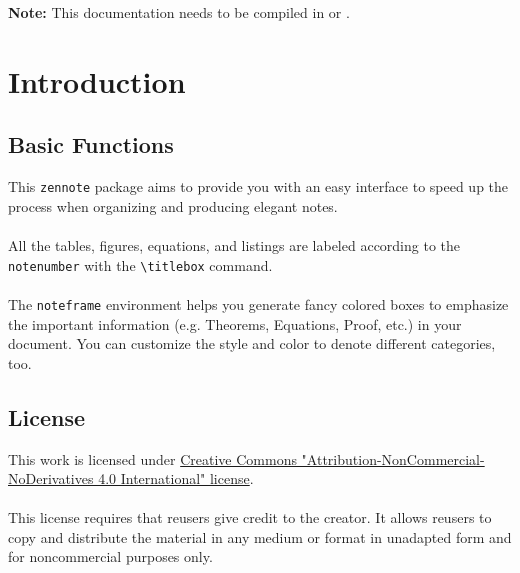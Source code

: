 \documentclass{article}
\begin{document}

{{\bf Note: }This documentation needs to be compiled in {\textcm {}} or {\textcm {}}.}

\thispagestyle{empty}
\tableofcontents

\newpage
\setcounter{page}{1}

\section{Introduction}
\subsection{Basic Functions}
This {\tt zennote} package aims to provide you with an easy interface to speed up the process when organizing and producing elegant notes.\\
\\
All the tables, figures, equations, and listings are labeled according to the {\tt notenumber} with the \verb+\titlebox+ command.\\
\\
The {\tt noteframe} environment helps you generate fancy colored boxes to emphasize the important information (e.g. Theorems, Equations, Proof, etc.) in your document. You can customize the style and color to denote different categories, too.

\subsection{License}
This work is licensed under \href{https://creativecommons.org/licenses/by-nc-nd/4.0/}{Creative Commons "Attribution-NonCommercial-NoDerivatives 4.0 International" license}.\\
\\
This license requires that reusers give credit to the creator. It allows reusers to copy and distribute the material in any medium or format in unadapted form and for noncommercial purposes only.\\
\\
\begin{flushright}
    \doclicenseImage
\end{flushright}
\end{document}
